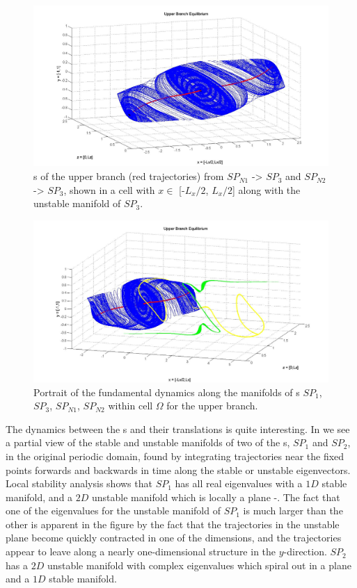\documentclass[lineno]{jfm}
\begin{document}
    \begin{figure}[!h]
\includegraphics[width=1.0\textwidth]{man14_june3.jpg}
  \caption{
{\Hec}s of the upper branch (red trajectories) from 
$SP_{N1}$ -> $SP_3$ and $SP_{N2}$ -> $SP_3$, shown in a cell with $x \in$ 
[-$L_x/2$, $L_x/2$] along with the unstable manifold of $SP_3$. 
   }
  \label{fig:hetero1}
 \end{figure}

  \begin{figure}[!h]
\includegraphics[width=1.1\textwidth]{june4_fig7.jpg}
  \caption{
Portrait of the fundamental dynamics along the manifolds of \stagp s 
$SP_1$, $SP_3$, $SP_{N1}$, $SP_{N2}$ within cell $\Omega$ for the upper 
branch. 
   }
  \label{fig:hetero2}
 \end{figure}

The dynamics between the \stagp s and their translations is quite 
interesting. In  we see a partial view of 
the stable and unstable manifolds of two of the {\stagp}s, $SP_1$ and 
$SP_2$, in the original periodic domain, found by integrating 
trajectories near the fixed points forwards and backwards in time along 
the stable or unstable eigenvectors. Local stability analysis shows that 
$SP_1$ has all real eigenvalues with a $1D$ stable manifold, and a $2D$ 
unstable manifold which is locally a plane 
-. The fact that one of the eigenvalues 
for the unstable manifold of $SP_1$ is much larger than the other is 
apparent in the figure by the fact that the trajectories in the unstable 
plane become quickly contracted in one of the dimensions, and the 
trajectories appear to leave along a nearly one-dimensional structure in 
the $y$-direction. $SP_2$ has a $2D$ unstable manifold with complex 
eigenvalues which spiral out in a plane and a $1D$ stable manifold. 
 
\end{document}
